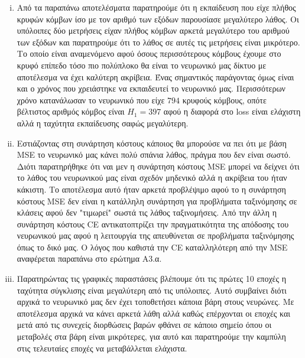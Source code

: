 \documentclass[12pt,a4paper]{article}
\newcommand{\tl}{\textlatin}
\begin{document}
\begin{enumerate}[a]
            \begin{enumerate}[i)]
                \item  Από τα παραπάνω αποτελέσματα παρατηρούμε ότι η εκπαίδευση που είχε πλήθος κρυφών κόμβων ίσο με τον αριθμό των εξόδων παρουσίασε μεγαλύτερο λάθος. Οι υπόλοιπες δύο μετρήσεις είχαν πλήθος κόμβων αρκετά μεγαλύτερο του αριθμού των εξόδων και παρατηρούμε ότι το λάθος σε αυτές τις μετρήσεις είναι μικρότερο. Το οποίο είναι αναμενόμενο αφού όσους περισσότερους κόμβους έχουμε στο κρυφό επίπεδο τόσο πιο πολύπλοκο θα είναι το νευρωνικό μας δίκτυο με αποτέλεσμα να έχει καλύτερη ακρίβεια. Ένας σημαντικός παράγοντας όμως είναι και ο χρόνος που χρειάστηκε να εκπαιδευτεί το νευρωνικό μας. Περισσότερων χρόνο κατανάλωσαν το νευρωνικό που είχε $794$ κρυφούς κόμβους, οπότε βέλτιστος αριθμός κόμβος είναι $H_1 = 397$ αφού η διαφορά στο \tl{loss} είναι ελάχιστη αλλά η ταχύτητα εκπαίδευσης σαφώς μεγαλύτερη.
                \item Εστιάζοντας στη συνάρτηση κόστους κάποιος θα μπορούσε να πει ότι με βάση \tl{MSE} το νευρωνικό μας κάνει πολύ σπάνια λάθος, πράγμα που δεν είναι σωστό. Διότι παρατηρήθηκε ότι ναι μεν η συνάρτηση κόστους \tl{MSE}  μπορεί να δείχνει ότι το λάθος του νευρωνικού μας είναι σχεδόν μηδενικό αλλά η ακρίβεια του ήταν κάκιστη. Το αποτέλεσμα αυτό ήταν αρκετά προβλέψιμο αφού το η συνάρτηση κόστους \tl{MSE}  δεν είναι η κατάλληλη συνάρτηση για προβλήματα ταξινόμησης σε κλάσεις αφού δεν "τιμωρεί" σωστά τις λάθος ταξινομήσεις. Από την άλλη η συνάρτηση κόστους \tl{CE} αντικατοπτρίζει την πραγματικότητα της απόδοσης του νευρωνικού μας αφού η λειτουργία της απευθύνεται σε προβλήματα ταξινόμησης όπως το δικό μας. Ο λόγος που καθιστά την \tl{CE} καταλληλότερη από την \tl{MSE} αναφέρεται παραπάνω στο ερώτημα Α3.α.
                \item Παρατηρώντας τις γραφικές παραστάσεις βλέπουμε ότι τις πρώτες 10 εποχές η ταχύτητα σύγκλισης είναι μεγαλύτερη από τις υπόλοιπες. Αυτό συμβαίνει διότι αρχικά το νευρωνικό μας δεν έχει τοποθετήσει κάποια βάρη στους νευρώνες. Με αποτέλεσμα αρχικά να κάνει αρκετά λάθη αλλά καθώς επέρχονται οι εποχές και μετά από τις συνεχείς διορθώσεις βαρών φθάνει σε κάποιο σημείο όπου οι μεταβολές στα βάρη είναι μικρότερες, για αυτό και παρατηρούμε την καμπύλη στις τελευταίες εποχές να μεταβάλλεται ελάχιστα.
            \end{enumerate}


\end{enumerate}
\end{document}
